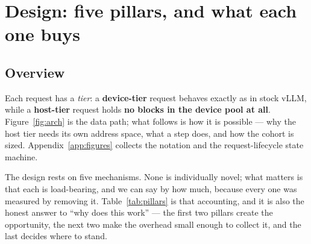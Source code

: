 %
%

\section{Design: five pillars, and what each one buys}
\label{sec:design}

\subsection{Overview}
\label{sec:design:overview}



Each request has a \emph{tier}: a \textbf{device-tier} request behaves exactly as
in stock vLLM, while a \textbf{host-tier} request holds \textbf{no blocks in the
device pool at all}. Figure~\ref{fig:arch} is the data path; what follows is how it
is possible --- why the host tier needs its own address space, what a step does, and
how the cohort is sized. Appendix~\ref{app:figures} collects the notation and the
request-lifecycle state machine.

The design rests on five mechanisms. None is individually novel; what matters is
that each is load-bearing, and we can say by how much, because every one was
measured by removing it. Table~\ref{tab:pillars} is that accounting, and it is
also the honest answer to ``why does this work'' --- the first two pillars create
the opportunity, the next two make the overhead small enough to collect it, and
the last decides where to stand.

